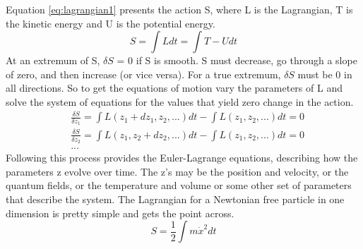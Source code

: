 Equation \ref{eq:lagrangian1} presents the action S, where L is the Lagrangian, T is the kinetic energy and U is the potential energy.     
\begin{equation}
\label{eq:lagrangian1}
S = \int L dt = \int T - U dt
\end{equation}
At an extremum of S, $\delta S$ = 0 if S is smooth. S must decrease, go through a slope of zero, and then increase (or vice versa). For a true extremum, $\delta S$ must be 0 in all directions. So to get the equations of motion vary the parameters of L and solve the system of equations for the values that yield zero change in the action.
\begin{equation}
\begin{split}
&\frac{\delta S}{\delta z_1} = \int L(z_1 + dz_1, z_2, ...)dt - \int L(z_1, z_2, ...)dt = 0 \\
&\frac{\delta S}{\delta z_2} = \int L(z_1, z_2 + dz_2, ...)dt - \int L(z_1, z_2, ...)dt = 0 \\
&...
\end{split}
\end{equation}
Following this process provides the Euler-Lagrange equations, describing how the parameters z evolve over time. The z's may be the position and velocity, or the quantum fields, or the temperature and volume or some other set of parameters that describe the system. The Lagrangian for a Newtonian free particle in one dimension is pretty simple and gets the point across. 
\begin{equation}
S = \frac{1}{2} \int m\dot{x}^2 dt
\end{equation}

